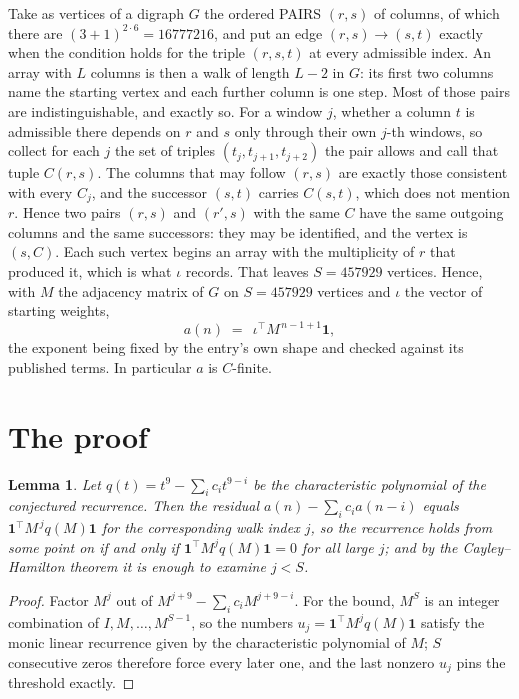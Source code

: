 \documentclass[11pt,a4paper]{article}
\theoremstyle{plain}
\newtheorem{lemma}[theorem]{Lemma}
\theoremstyle{definition}
\begin{document}
Take as vertices of a digraph $G$ the ordered PAIRS $(r,s)$ of columns, of which there are
$(3+1)^{2\cdot6}=16777216$, and put an edge $(r,s)\to(s,t)$ exactly when the condition
holds for the triple $(r,s,t)$ at every admissible index. An array with $L$ columns is then a
walk of length $L-2$ in $G$: its first two columns name the starting vertex and each further
column is one step. Most of those pairs are indistinguishable, and exactly so. For a window $j$, whether a column $t$ is admissible there depends on $r$ and $s$ only through their own $j$-th windows, so collect for each $j$ the set of triples $(t_j,t_{j+1},t_{j+2})$ the pair allows and call that tuple $C(r,s)$. The columns that may follow $(r,s)$ are exactly those consistent with every $C_j$, and the successor $(s,t)$ carries $C(s,t)$, which does not mention $r$. Hence two pairs $(r,s)$ and $(r',s)$ with the same $C$ have the same outgoing columns and the same successors: they may be identified, and the vertex is $(s,C)$. Each such vertex begins an array with the multiplicity of $r$ that produced it, which is what $\iota$ records. That leaves $S=457929$ vertices. Hence, with $M$ the adjacency matrix of $G$ on $S=457929$ vertices and
$\iota$ the vector of starting weights,
\[
a(n)\;=\;\,\iota^{\!\top}M^{\,n-1+1}\mathbf{1},
\]
the exponent being fixed by the entry's own shape and checked against its published terms.
In particular $a$ is $C$-finite.

\section{The proof}

\begin{lemma}\label{lem:crit}
Let $q(t)=t^{9}-\sum_i c_it^{9-i}$ be the characteristic polynomial of the
conjectured recurrence. Then the residual $a(n)-\sum_ic_ia(n-i)$ equals
$\mathbf{1}^{\!\top}M^{\,j}q(M)\mathbf{1}$ for the corresponding walk index
$j$, so the recurrence holds from some point on if and only if
$\mathbf{1}^{\!\top}M^{j}q(M)\mathbf{1}=0$ for all large $j$; and by the
Cayley--Hamilton theorem it is enough to examine $j<S$.
\end{lemma}

\begin{proof}
Factor $M^{j}$ out of $M^{j+9}-\sum_ic_iM^{j+9-i}$. For the bound, $M^{S}$
is an integer combination of $I,M,\dots,M^{S-1}$, so the numbers
$u_j=\mathbf{1}^{\!\top}M^{j}q(M)\mathbf{1}$ satisfy the monic linear recurrence given by
the characteristic polynomial of $M$; $S$ consecutive zeros therefore force every later one,
and the last nonzero $u_j$ pins the threshold exactly.
\end{proof}
\end{document}
